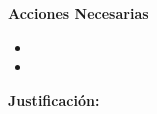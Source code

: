 \documentclass[12pt]{article}
\begin{document}
\vspace{0.1cm}

\textbf{Acciones Necesarias}
\begin{itemize}
    \item
    \item
\end{itemize}

\vspace{0.1cm}

\textbf{Justificación:}

\vspace{0.3cm}


%
%
%
%
%
%
\end{document}
